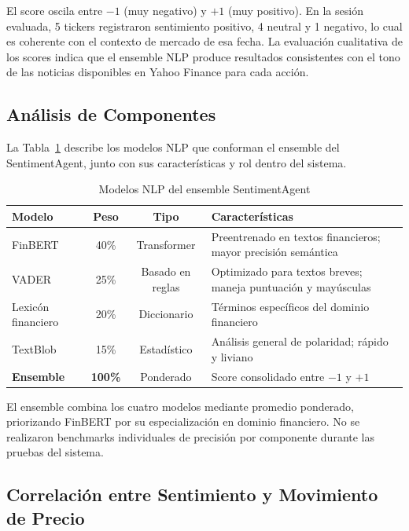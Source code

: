   El score oscila entre $-1$ (muy negativo) y $+1$ (muy positivo). En la sesión evaluada, 5
  tickers registraron sentimiento positivo, 4 neutral y 1 negativo, lo cual es coherente con  
  el contexto de mercado de esa fecha. La evaluación cualitativa de los scores indica que el  
  ensemble NLP produce resultados consistentes con el tono de las noticias disponibles en     
  Yahoo Finance para cada acción.


\subsection{Análisis de Componentes}

  La Tabla~\ref{tab:modelos-nlp} describe los modelos NLP que conforman el ensemble del       
  SentimentAgent, junto con sus características y rol dentro del sistema.

  \begin{table}[H]
  \centering
  \caption{Modelos NLP del ensemble SentimentAgent}
  \label{tab:modelos-nlp}
  \begin{tabular}{lccp{5cm}}
  \toprule
  \textbf{Modelo} & \textbf{Peso} & \textbf{Tipo} & \textbf{Características} \\
  \midrule
  FinBERT         & 40\% & Transformer & Preentrenado en textos financieros; mayor precisión  
  semántica \\
  VADER           & 25\% & Basado en reglas & Optimizado para textos breves; maneja puntuación   y mayúsculas \\
  Lexicón financiero & 20\% & Diccionario & Términos específicos del dominio financiero \\    
  TextBlob        & 15\% & Estadístico & Análisis general de polaridad; rápido y liviano \\   
  \midrule
  \textbf{Ensemble} & \textbf{100\%} & Ponderado & Score consolidado entre $-1$ y $+1$ \\     
  \bottomrule
  \end{tabular}
  \end{table}

  El ensemble combina los cuatro modelos mediante promedio ponderado, priorizando FinBERT por 
  su especialización en dominio financiero. No se realizaron benchmarks individuales de       
  precisión por componente durante las pruebas del sistema.
\subsection{Correlación entre Sentimiento y Movimiento de Precio}

